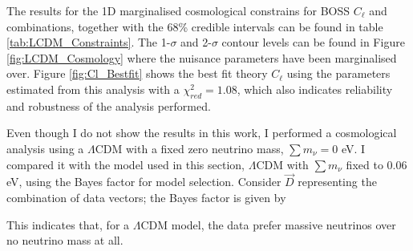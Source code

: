 \qquad The results for the 1D marginalised cosmological constrains for BOSS $C_{\ell}$ and combinations, together with the 68\% credible intervals can be found in table \ref{tab:LCDM_Constraints}. The 1-$\sigma$ and 2-$\sigma$ contour levels can be found in Figure \ref{fig:LCDM_Cosmology} where the nuisance parameters have been marginalised over. Figure \ref{fig:Cl_Bestfit} shows the best fit theory $C_{\ell}$ using the parameters estimated from this analysis with a $\chi^2_{red} = 1.08$, which also indicates reliability and robustness of the analysis performed. 

\qquad Even though I do not show the results in this work, I performed a cosmological analysis using a $\Lambda$CDM with a fixed zero neutrino mass, $\sum m_{\nu} = 0$ eV. I compared it with the model used in this section, $\Lambda$CDM with $\sum m_{\nu}$ fixed to $0.06$ eV, using the Bayes factor for model selection. Consider $\vec{D}$ representing the combination of data vectors; the Bayes factor is given by

\noindent This indicates that, for a $\Lambda$CDM model, the data prefer massive neutrinos over no neutrino mass at all.


